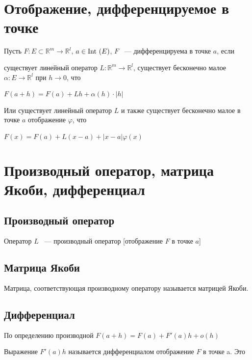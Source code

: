 \documentclass{article}
\begin{document}
    \newpage
    
    \section{Отображение, дифференцируемое в точке}
    
        Пусть $F : E \subset \mathbb{R}^m \rightarrow \mathbb{R}^l$, $a \in \Int(E)$, $F$ ~--- дифференцируема в точке $a$, если
        
        существует линейный оператор $L : \mathbb{R}^m \rightarrow \mathbb{R}^l$, существует бесконечно малое $\alpha : E \rightarrow \mathbb{R}^l$ при $h \rightarrow 0$, что
        
        $F(a + h) = F(a) + Lh + \alpha(h) \cdot |h|$
        
        Или существует линейный оператор $L$ и также существует бесконечно малое в точке $a$ отображение $\varphi$, что
        
        $F(x) = F(a) + L(x - a) + | x - a| \varphi(x)$
        
    \newpage
    
    \section{Производный оператор, матрица Якоби, дифференциал}
    
        \subsection{Производный оператор}
        
            Оператор $L$ ~--- производный оператор [отображение $F$ в точке $a$]
            
        \subsection{Матрица Якоби}
        
            Матрица, соответствующая производному оператору называется матрицей Якоби.
            
        \subsection{Дифференциал}
        
            По определению производной $F(a + h) = F(a) + F'(a)h + o(h)$
            
            Выражение $F'(a)h$ называется дифференциалом отображение $F$ в точке a. Это
            
\end{document}
